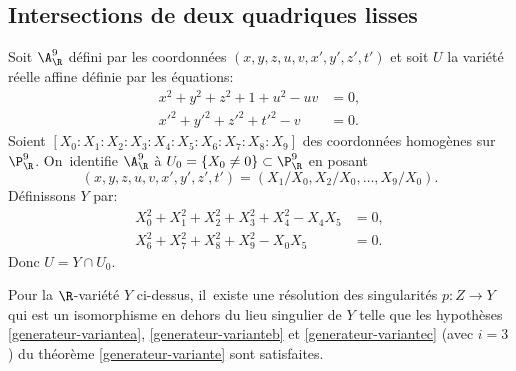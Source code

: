 \subsection{Intersections de deux quadriques lisses}

Soit $\A^9_\R$ défini par les coordonnées $(x, y, z, u, v, x', y', z', t')$ et soit $U$ la variété réelle affine définie par les équations:
\begin{align}
x^2+y^2+z^2+1+u^2 - uv &= 0, \label{eq:U1} \\
x'^2+y'^2+z'^2+t'^2 - v &= 0. \label{eq:U2}
\end{align}
Soient $[X_0: X_1: X_2: X_3: X_4: X_5: X_6: X_7: X_8: X_9]$ des coordonnées homogènes sur $\P^9_\R$. On~identifie $\A^9_\R$ à $U_0=\{X_0\neq 0\}\subset \P^9_\R$ en posant
\[(x,y,z,u,v,x',y',z',t')=(X_1/X_0,X_2/X_0,\dots, X_9/X_0).\]
Définissons $Y$ par:
\begin{align}
X_0^2+X_1^2+X_2^2+X_3^2+X_4^2 - X_4X_5 &= 0, \label{eq:F1} \\
X_6^2+X_7^2+X_8^2+X_9^2 -X_0X_5 &= 0. \label{eq:F2}
\end{align}
Donc $U=Y\cap U_0$.

\begin{lemma}\label{int-2-quadriques-a-c}
Pour la $\R$-variété $Y$ ci-dessus, il~existe une résolution des singularités $p\colon Z\to Y$ qui est un isomorphisme en dehors du lieu singulier de $Y$ telle que les hypothèses \eqref{generateur-variantea}, \eqref{generateur-varianteb} et \eqref{generateur-variantec} (avec $i=3$) du théorème \ref{generateur-variante} sont satisfaites.
\end{lemma}

